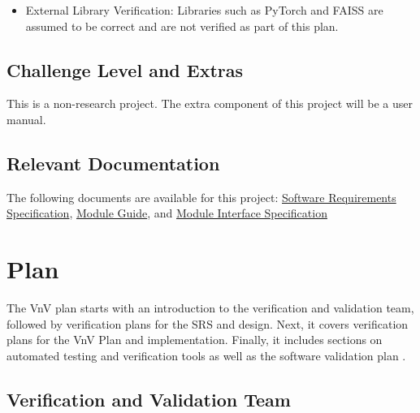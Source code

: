 \documentclass[12pt, titlepage]{article}
\begin{document}
\begin{itemize}
  \item External Library Verification: Libraries such as PyTorch and FAISS are assumed to be correct and are not verified as part of this plan.
\end{itemize}

\subsection{Challenge Level and Extras}
This is a non-research project. The extra component of this project will be a user manual.

\subsection{Relevant Documentation}
The following documents are available for this project:
\href{https://github.com/V-AS/Two-tower-recommender-system/blob/main/docs/SRS/SRS.pdf}{Software Requirements Specification}, \href{https://github.com/V-AS/Two-tower-recommender-system/blob/main/docs/Design/SoftArchitecture/MG.pdf}{Module Guide}, and \href{https://github.com/V-AS/Two-tower-recommender-system/blob/main/docs/Design/SoftDetailedDes/MIS.pdf}{Module Interface Specification} 

\section{Plan}

The VnV plan starts with an introduction to the verification and validation team, followed by verification plans for the SRS and design. Next, it covers verification plans for the VnV Plan and implementation. Finally, it includes sections on automated testing and verification tools as well as the software validation plan .

\subsection{Verification and Validation Team}\label{VnVT}

\begin{table}[h]
  \centering
  \caption{Verification and Validation Team}
  \label{Table:VnVT}
  \end{table}
  
\end{document}
